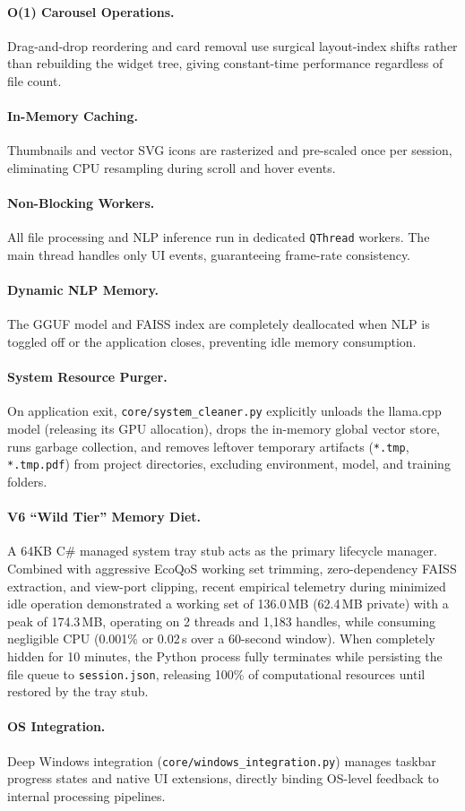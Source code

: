 \documentclass[11pt]{article}
\begin{document}
\paragraph{O(1) Carousel Operations.}
Drag-and-drop reordering and card removal use surgical layout-index shifts
rather than rebuilding the widget tree, giving constant-time performance
regardless of file count.

\paragraph{In-Memory Caching.}
Thumbnails and vector SVG icons are rasterized and pre-scaled once per
session, eliminating CPU resampling during scroll and hover events.

\paragraph{Non-Blocking Workers.}
All file processing and NLP inference run in dedicated \texttt{QThread}
workers. The main thread handles only UI events, guaranteeing frame-rate
consistency.

\paragraph{Dynamic NLP Memory.}
The GGUF model and FAISS index are completely deallocated when NLP is toggled
off or the application closes, preventing idle memory consumption.

\paragraph{System Resource Purger.}
On application exit, \texttt{core/system\_cleaner.py} explicitly unloads the llama.cpp model (releasing its GPU allocation), drops the in-memory global vector store, runs garbage collection, and removes leftover temporary artifacts (\texttt{*.tmp}, \texttt{*.tmp.pdf}) from project directories, excluding environment, model, and training folders.

\paragraph{V6 ``Wild Tier'' Memory Diet.}
A 64KB C\# managed system tray stub acts as the primary lifecycle manager. Combined with aggressive EcoQoS working set trimming, zero-dependency FAISS extraction, and view-port clipping, recent empirical telemetry during minimized idle operation demonstrated a working set of 136.0\,MB (62.4\,MB private) with a peak of 174.3\,MB, operating on 2 threads and 1,183 handles, while consuming negligible CPU (0.001\% or 0.02\,s over a 60-second window). When completely hidden for 10 minutes, the Python process fully terminates while persisting the file queue to \texttt{session.json}, releasing 100\% of computational resources until restored by the tray stub.

\paragraph{OS Integration.}
Deep Windows integration (\texttt{core/windows\_integration.py}) manages taskbar progress states and native UI extensions, directly binding OS-level feedback to internal processing pipelines.
\end{document}
